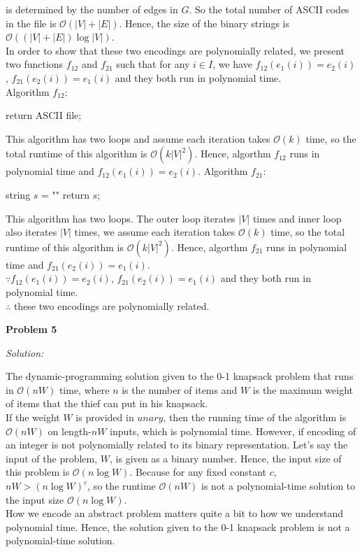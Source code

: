 \documentclass[12pt,letterpaper]{article}
\def\pp{\par\noindent}
\newcommand{\problem}[1]{ \bigskip \pp \textbf{Problem #1}\par}
\newcommand{\solution}{\textit{Solution:}\par}
\begin{document}
is determined by the number of edges in $G$. So the total number of ASCII codes in the file is $\mathcal{O}(|V|+|E|)$. Hence, the
size of the binary strings is $\mathcal{O}((|V|+|E|) \log|V|)$. \\
In order to show that these two encodings are polynomially related, we present two functions $f_{12}$ and $f_{21}$ such that
for any $i \in I$, we have $f_{12}(e_1(i)) = e_2(i)$, $f_{21}(e_2(i)) = e_1(i)$ and they both run in polynomial time. \\
Algorithm $f_{12}$: \\
\begin{algorithm}[H]
return ASCII file;
\end{algorithm}
This algorithm has two loops and assume each iteration takes $\mathcal{O}(k)$ time, so the total runtime of this algorithm is $\mathcal{O}(k|V|^2)$.
Hence, algorthm $f_{12}$ runs in polynomial time and $f_{12}(e_1(i)) = e_2(i)$.
Algorithm $f_{21}$: \\
\begin{algorithm}[H]
string $s$ = "" \;
return $s$;
\end{algorithm}
This algorithm has two loops. The outer loop iterates $|V|$ times and inner loop also iterates $|V|$ times,
we assume each iteration takes $\mathcal{O}(k)$ time, so the total runtime of this algorithm is $\mathcal{O}(k|V|^2)$.
Hence, algorthm $f_{21}$ runs in polynomial time and $f_{21}(e_2(i)) = e_1(i)$. \\
$\because f_{12}(e_1(i)) = e_2(i)$, $f_{21}(e_2(i)) = e_1(i)$ and they both run in polynomial time. \\
$\therefore$ these two encodings are polynomially related.

\problem{5}
\solution
The dynamic-programming solution given to the 0-1 knapsack problem that runs in $\mathcal{O}(nW)$ time,
where $n$ is the number of items and $W$ is the maximum weight of items that the thief can put in his knapsack. \\
If the weight $W$ is provided in $unary$, then the running time of the algorithm is $\mathcal{O}(nW)$ on length-$nW$ inputs,
which is polynomial time. However, if encoding of an integer is not polynomially related to its binary representation.
Let's say the input of the problem, $W$, is given as a binary number. Hence, the input size of this problem
is $\mathcal{O}(n \log W)$. Because for any fixed constant $c$, $nW > (n \log W)^{c}$, so the runtime $\mathcal{O}(nW)$
is not a polynomial-time solution to the input size $\mathcal{O}(n \log W)$. \\
How we encode an abstract problem matters quite a bit to how we understand polynomial time. Hence, the solution given to the 0-1 knapsack problem is not a polynomial-time solution.
\end{document}
